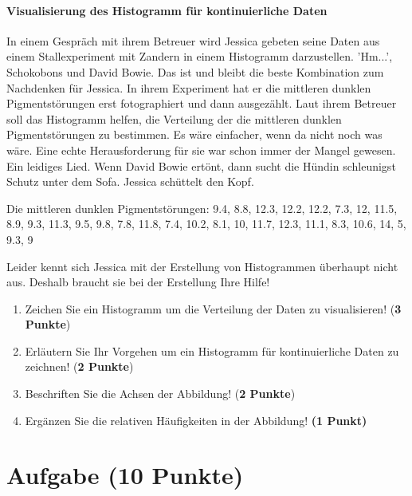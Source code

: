 \documentclass[a4paper, 9pt]{scrartcl}\usepackage[]{graphicx}\usepackage[]{xcolor}
\begin{document}
\ifcollection
\paragraph{Visualisierung des Histogramm für kontinuierliche Daten}
\fi

In einem Gespräch mit ihrem Betreuer wird Jessica gebeten seine Daten aus einem Stallexperiment mit Zandern in einem Histogramm darzustellen. 'Hm...', Schokobons und David Bowie. Das ist und bleibt die beste Kombination zum Nachdenken für Jessica. In ihrem Experiment hat er die mittleren dunklen Pigmentstörungen erst fotographiert und dann ausgezählt. Laut ihrem Betreuer soll das Histogramm helfen, die Verteilung der die mittleren dunklen Pigmentstörungen zu bestimmen.  Es wäre einfacher, wenn da nicht noch was wäre. Eine echte Herausforderung für sie war schon immer der Mangel gewesen. Ein leidiges Lied. Wenn David Bowie ertönt, dann sucht die Hündin schleunigst Schutz unter dem Sofa. Jessica schüttelt den Kopf.

\begin{center}
Die mittleren dunklen Pigmentstörungen: 9.4, 8.8, 12.3, 12.2, 12.2, 7.3, 12, 11.5, 8.9, 9.3, 11.3, 9.5, 9.8, 7.8, 11.8, 7.4, 10.2, 8.1, 10, 11.7, 12.3, 11.1, 8.3, 10.6, 14, 5, 9.3, 9
\end{center}

Leider kennt sich Jessica mit der Erstellung von Histogrammen überhaupt nicht aus. Deshalb braucht sie bei der Erstellung Ihre Hilfe!

\begin{enumerate}
\item Zeichen Sie ein Histogramm um die Verteilung der Daten zu visualisieren! (\textbf{3 Punkte})
 \item Erläutern Sie Ihr Vorgehen um ein Histogramm für kontinuierliche Daten zu zeichnen!  (\textbf{2 Punkte})
\item Beschriften Sie die Achsen der Abbildung! (\textbf{2 Punkte})
\item Ergänzen Sie die relativen Häufigkeiten in der Abbildung! \textbf{(1 Punkt)}  
\end{enumerate}

 
\clearpage

\section{Aufgabe \hfill (10 Punkte)}
\end{document}

